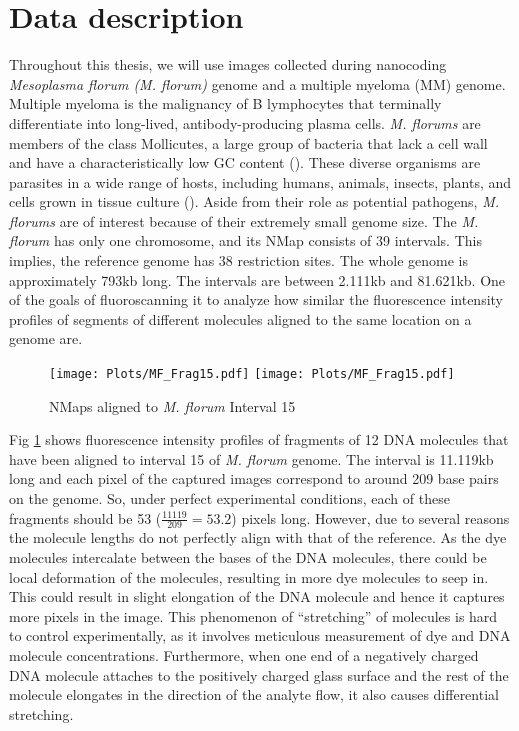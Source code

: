 \section{Data description}
Throughout this thesis, we will use images collected during nanocoding {\emph{Mesoplasma florum (M. florum)}} genome and a multiple myeloma (MM) genome. Multiple myeloma is the malignancy of B lymphocytes
that terminally differentiate into long-lived, antibody-producing plasma cells. {\emph{M. florums}} are members of the class Mollicutes, a large group of bacteria that lack a cell wall and have a characteristically low GC content (\cite{Razin_etal_1998_MMBR}). These diverse organisms are parasites in a wide range of hosts, including humans, animals, insects, plants, and cells grown in tissue culture (\cite{Razin_etal_1998_MMBR}). Aside from their role as potential pathogens, {\emph{M. florums}} are of interest because of their extremely small genome size. The {\emph{M. florum}} has only one chromosome, and its NMap consists of 39 intervals. This implies, the reference genome has 38 restriction sites. The whole genome is approximately 793kb long. The intervals are between 2.111kb and 81.621kb. One of the goals of fluoroscanning it to analyze how similar the fluorescence intensity profiles of segments of different molecules aligned to the same location on a genome are. 
\begin{figure}[H]
\begin{center}
\texttt{[image: Plots/MF\_Frag15.pdf]}
\texttt{[image: Plots/MF\_Frag15.pdf]}
\end{center}
\caption{NMaps aligned to {\emph{M. florum}} Interval 15}
\label{fig:Fig2_MF_Frag15}
\end{figure}

Fig \ref{fig:Fig2_MF_Frag15} shows fluorescence intensity profiles of fragments of 12 DNA molecules that have been aligned to interval 15 of {\emph{M. florum}} genome. The interval is 11.119kb long and each pixel of the captured images correspond to around 209 base pairs on the genome. So, under perfect experimental conditions, each of these fragments should be 53 ($\frac{11119}{209} = 53.2$) pixels long. However, due to several reasons the molecule lengths do not perfectly align with that of the reference. As the dye molecules intercalate between the bases of the DNA molecules, there could be local deformation of the molecules, resulting in more dye molecules to seep in. This could result in slight elongation of the DNA molecule and hence it captures more pixels in the image. This phenomenon of ``stretching'' of molecules is hard to control experimentally, as it involves meticulous measurement of dye and DNA molecule concentrations. Furthermore, when one end of a negatively charged DNA molecule attaches to the positively charged glass surface and the rest of the molecule elongates in the direction of the analyte flow, it also causes differential stretching. 




